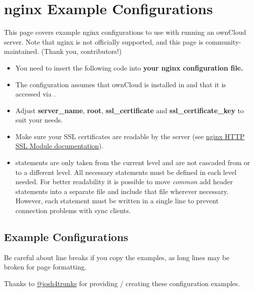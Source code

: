 \documentclass[letterpaper,10pt,english]{sphinxmanual}
\begin{document}
\section{nginx Example Configurations}
\label{installation/nginx_examples::doc}\label{installation/nginx_examples:nginx-example-configurations}
This page covers example nginx configurations to use with running an ownCloud
server. Note that nginx is not officially supported, and this page is
community-maintained. (Thank you, contributors!)
\begin{itemize}
\item {} 
You need to insert the following code into \textbf{your nginx configuration file.}

\item {} 
The configuration assumes that ownCloud is installed in
 and that it is accessed via
.

\item {} 
Adjust \textbf{server\_name}, \textbf{root}, \textbf{ssl\_certificate} and
\textbf{ssl\_certificate\_key} to suit your needs.

\item {} 
Make sure your SSL certificates are readable by the server (see \href{http://wiki.nginx.org/HttpSslModule}{nginx HTTP
SSL Module documentation}).

\item {} 
 statements are only taken from the current level and are not
cascaded from or to a different level. All necessary 
statements must be defined in each level needed. For better readability it
is possible to move \emph{common} add header statements into a separate file
and include that file wherever necessary. However, each 
statement must be written in a single line to prevent connection problems
with sync clients.

\end{itemize}


\subsection{Example Configurations}
\label{installation/nginx_examples:example-configurations}
Be careful about line breaks if you copy the examples, as long lines may be broken
for page formatting.

Thanks to \href{https://github.com/josh4trunks}{@josh4trunks} for providing /
creating these configuration examples.
\end{document}
